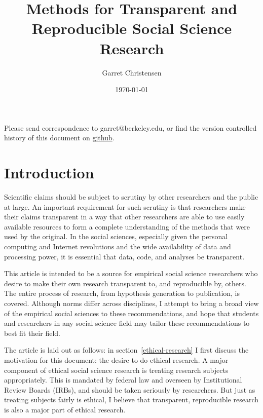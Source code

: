 \documentclass[12pt] {article}
\begin{document}
\title{Methods for Transparent and Reproducible Social Science Research}

\author[1]{Garret Christensen}
\date{\today}
\maketitle

\begin{center}
Please send correspondence to garret@berkeley.edu, or find the version controlled history of this document on \href{https://github.com/garretchristensen/BestPracticesManual}{github}.
\end{center}

\newpage
\tableofcontents

\newpage
\section{Introduction}\label{introduction}

Scientific claims should be subject to scrutiny by other researchers and
the public at large. An important requirement for such scrutiny is that
researchers make their claims transparent in a way that other
researchers are able to use easily available resources to form a
complete understanding of the methods that were used by the original. In
the social sciences, especially given the personal computing and
Internet revolutions and the wide availability of data and processing
power, it is essential that data, code, and analyses be transparent.

This article is intended to be a source for empirical social
science researchers who desire to make their own research transparent
to, and reproducible by, others. The entire process of research, from
hypothesis generation to publication, is covered. Although norms differ
across disciplines, I attempt to bring a broad view of the empirical
social sciences to these recommendations, and hope that students and
researchers in any social science field may tailor these recommendations
to best fit their field.

The article is laid out as follows: in section~\ref{ethical-research} I first discuss the motivation for this document: the
desire to do ethical research. A major component of ethical social
science research is treating research subjects appropriately. This is
mandated by federal law and overseen by Institutional Review Boards
(IRBs), and should be taken seriously by researchers. But just as
treating subjects fairly is ethical, I believe that transparent,
reproducible research is also a major part of ethical research.
\end{document}
